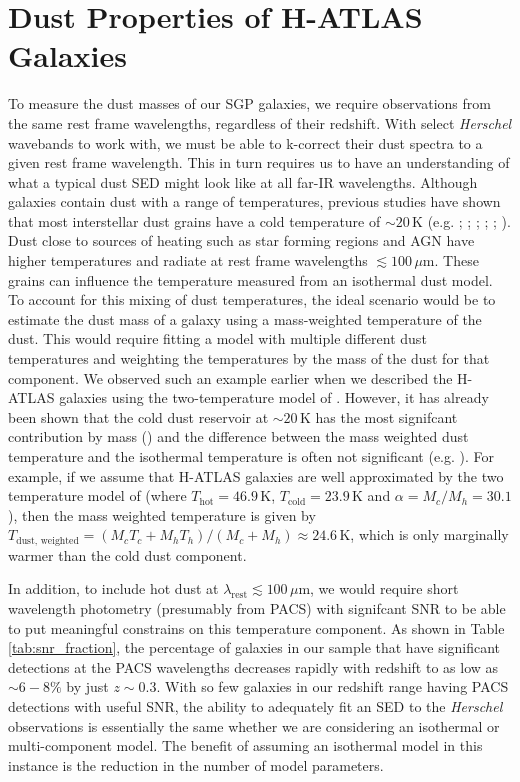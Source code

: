 \section{Dust Properties of H-ATLAS Galaxies}

To measure the dust masses of our SGP galaxies, we require observations from the same rest frame wavelengths, regardless of their redshift. With select \textit{Herschel} wavebands to work with, we must be able to k-correct their dust spectra to a given rest frame wavelength. This in turn requires us to have an understanding of what a typical dust SED might look like at all far-IR wavelengths. Although galaxies contain dust with a range of temperatures, previous studies have shown that most interstellar dust grains have a cold temperature of $\sim 20\,$K (e.g. \citealt{Dunne_2001}; \citealt{Vlahakis_2005}; \citealt{Draine_2007a}; \citealt{Boselli_2010}; \citealt{Smith_2012b}; \citealt{Smith_2013}). Dust close to sources of heating such as star forming regions and AGN have higher temperatures and radiate at rest frame wavelengths $\lesssim 100\,\mu$m. These grains can influence the temperature measured from an isothermal dust model. To account for this mixing of dust temperatures, the ideal scenario would be to estimate the dust mass of a galaxy using a mass-weighted temperature of the dust. This would require fitting a model with multiple different dust temperatures and weighting the temperatures by the mass of the dust for that component. We observed such an example earlier when we described the H-ATLAS galaxies using the two-temperature model of \citealt{Pearson_2013}. However, it has already been shown that the cold dust reservoir at $\sim 20\,$K has the most signifcant contribution by mass (\citealt{Pearson_2013}) and the difference between the mass weighted dust temperature and the isothermal temperature is often not significant (e.g. \citealt{Clark_2015}). For example, if we assume that H-ATLAS galaxies are well approximated by the two temperature model of \citealt{Pearson_2013} (where $T_{\textrm{hot}} = 46.9\,$K, $T_{\textrm{cold}} = 23.9\,$K and $\alpha = M_c/M_h = 30.1$), then the mass weighted temperature is given by $T_{\textrm{dust, weighted}} = (M_cT_c + M_hT_h)/(M_c + M_h) \approx 24.6\,$K, which is only marginally warmer than the cold dust component.

In addition, to include hot dust at $\lambda_{\textrm{rest}} \lesssim 100\,\mu$m, we would require short wavelength photometry (presumably from PACS) with signifcant SNR to be able to put meaningful constrains on this temperature component. As shown in Table \ref{tab:snr_fraction}, the percentage of galaxies in our sample that have significant detections at the PACS wavelengths decreases rapidly with redshift to as low as $\sim 6 - 8\%$ by just $z \sim 0.3$. With so few galaxies in our redshift range having PACS detections with useful SNR, the ability to adequately fit an SED to the \textit{Herschel} observations is essentially the same whether we are considering an isothermal or multi-component model. The benefit of assuming an isothermal model in this instance is the reduction in the number of model parameters.

